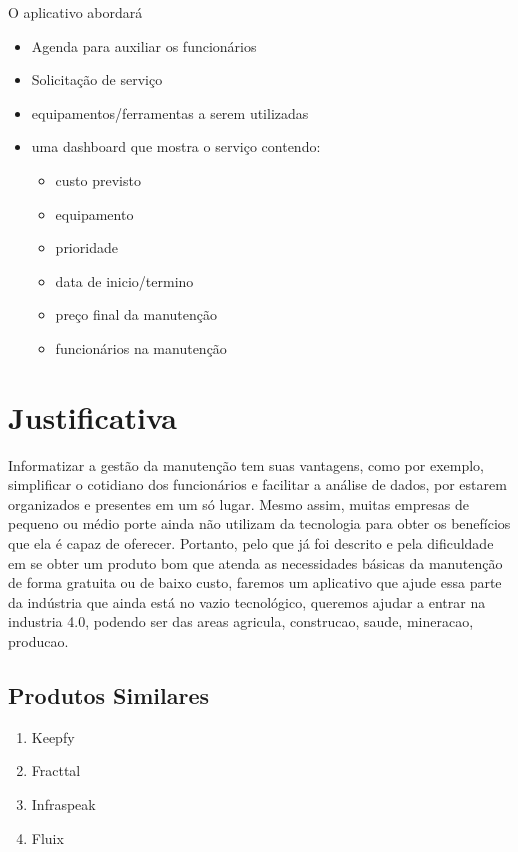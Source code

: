\documentclass[%
  a4paper,%
  12pt,%
  english,%
  brazilian,%
]{article}
\begin{document}
O aplicativo abordará 
\begin{itemize}
    \item Agenda para auxiliar os funcionários
    \item Solicitação de serviço
    \item equipamentos/ferramentas a serem utilizadas
    \item uma dashboard que mostra o serviço contendo:
    \begin{itemize}
    \item custo previsto
    \item equipamento
    \item prioridade 
    \item data de inicio/termino
    \item preço final da manutenção
    \item funcionários na manutenção
    \end{itemize}    
\end{itemize}
    

\section{Justificativa}%
Informatizar a gestão da manutenção tem suas vantagens, como por exemplo, simplificar o cotidiano dos funcionários e facilitar a análise de dados, por estarem organizados e presentes em um só lugar. Mesmo assim, muitas empresas de pequeno ou médio porte ainda não utilizam da tecnologia para obter os benefícios que ela é capaz de oferecer. Portanto, pelo que já foi descrito e pela dificuldade em se obter um produto bom que atenda as necessidades básicas da manutenção de forma gratuita ou de baixo custo, faremos um aplicativo que ajude essa parte da indústria que ainda está no vazio tecnológico, queremos ajudar a entrar na industria 4.0, podendo ser das areas agricula, construcao, saude, mineracao, producao.

\subsection{Produtos Similares}
\begin{enumerate}
    \item Keepfy
    \item Fracttal
    \item Infraspeak
    \item Fluix
\end{enumerate}

\end{document}
